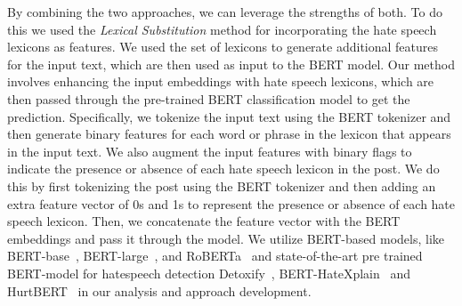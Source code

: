 By combining the two approaches, we can leverage the strengths of both.
To do this we used the \textit{Lexical Substitution} method for incorporating the hate speech lexicons as features.
We used the set of lexicons to generate additional features for the input text, which are then used as input to the BERT model.
Our method involves enhancing the input embeddings with hate speech lexicons, which are then passed through the pre-trained BERT classification model to get the prediction. Specifically, we tokenize the input text using the BERT tokenizer and then generate binary features for each word or phrase in the lexicon that appears in the input text.
We also augment the input features with binary flags to indicate the presence or absence of each hate speech lexicon in the post.
We do this by first tokenizing the post using the BERT tokenizer and then adding an extra feature vector of 0s and 1s to represent the presence or absence of each hate speech lexicon.
Then, we concatenate the feature vector with the BERT embeddings and pass it through the model. We utilize BERT-based models, like BERT-base~\cite{devlin2018bert}, BERT-large~\cite{devlin2018bert}, and RoBERTa~\cite{liu2019roberta} and state-of-the-art pre trained BERT-model for hatespeech detection Detoxify~\cite{Detoxify}, BERT-HateXplain~\cite{Mathew_Saha_Yimam_Biemann_Goyal_Mukherjee_2021} and HurtBERT~\cite{hurtbert2020} in our analysis and approach development.